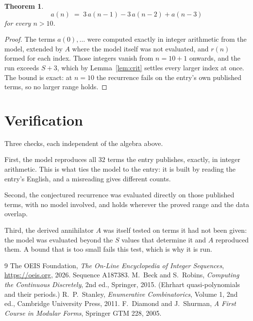 \documentclass[11pt,a4paper]{article}
\theoremstyle{plain}
\newtheorem{theorem}{Theorem}
\theoremstyle{definition}
\begin{document}
\begin{theorem}
\[
a(n)\;=\;3\,a(n-1) - 3\,a(n-2) + a(n-3)
\]
for every $n>10$.
\end{theorem}

\begin{proof}
The terms $a(0),\dots$ were computed exactly in integer arithmetic from the model, extended by
$A$ where the model itself was not evaluated, and $r(n)$ formed for each index. Those integers
vanish from $n=10+1$ onwards, and the run exceeds $S+3$, which by
Lemma~\ref{lem:crit} settles every larger index at once. The bound is exact: at $n=10$ the recurrence fails on the entry's own published terms, so no larger range holds.
\end{proof}

\section{Verification}

Three checks, each independent of the algebra above.

First, the model reproduces all $32$ terms the entry publishes, exactly, in integer
arithmetic. This is what ties the model to the entry: it is built by reading the entry's
English, and a misreading gives different counts.

Second, the conjectured recurrence was evaluated directly on those published terms, with no
model involved, and holds wherever the proved range and the data overlap.

Third, the derived annihilator $A$ was itself tested on terms it had not been given: the model
was evaluated beyond the $S$ values that determine it and $A$ reproduced them. A bound that is
too small fails this test, which is why it is run.

\begin{thebibliography}{9}
 The OEIS Foundation, \emph{The On-Line Encyclopedia of Integer
Sequences}, \url{https://oeis.org}, 2026. Sequence A187383.
 M.~Beck and S.~Robins, \emph{Computing the Continuous Discretely},
2nd ed., Springer, 2015. (Ehrhart quasi-polynomials and their periods.)
 R.~P.~Stanley, \emph{Enumerative Combinatorics}, Volume 1, 2nd ed.,
Cambridge University Press, 2011.
 F.~Diamond and J.~Shurman, \emph{A First Course in Modular Forms},
Springer GTM 228, 2005.
\end{thebibliography}
\end{document}
